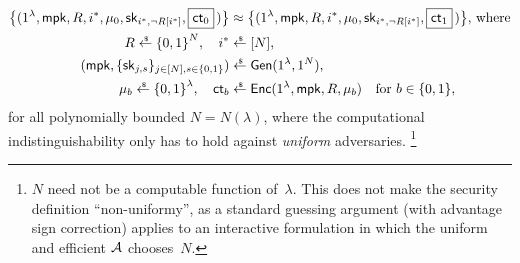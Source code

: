 \begin{definition}
\begin{align*}
\bigl\{(
1^\lambda,\mpk,R,i^\ast,\mu_0,\sk_{i^\ast,\neg R[i^\ast]},\boxed{\ct_0}\,
)\bigr\}
&{}\approx
\bigl\{(
1^\lambda,\mpk,R,i^\ast,\mu_0,\sk_{i^\ast,\neg R[i^\ast]},\boxed{\ct_1}\,
)\bigr\}
\WideNarrow{\textup{, where}}{,}\\
\WideNarrow{}{\textup{where}\qquad\qquad\qquad}
R\draws\bit^N,\quad
i^\ast&{}\draws[N],\\
(\mpk,\{\sk_{j,s}\}_{j\in[N],s\in\bit})
&{}\draws\Gen(1^\lambda,1^N),\\
\mu_b\draws\bit^\lambda,\quad
\ct_b&{}\draws\Enc(1^\lambda,\mpk,R,\mu_b)
\quad\textup{for }b\in\bit,
\end{align*}
for all polynomially bounded ${N=N(\lambda)}$,
where the computational indistinguishability only has to hold against \emph{uniform} adversaries.%
\footnote{$N$ need not be a computable function of~$\lambda$.
This does not make the security definition ``non-uniformy'',
as a standard guessing argument (with advantage sign correction) applies to an interactive formulation
in which the uniform and efficient ${\mathcal{A}}$ chooses~$N$.}
\end{definition}
